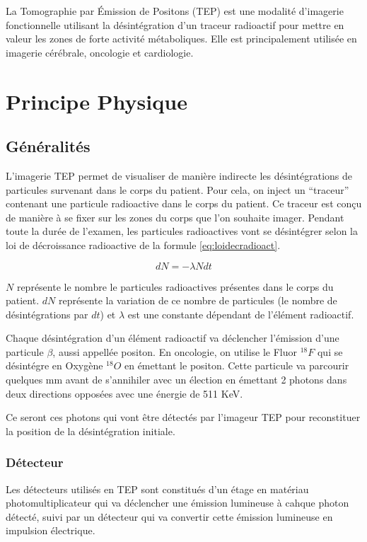 La Tomographie par \'Emission de Positons (TEP) est une modalité d'imagerie fonctionnelle utilisant la désintégration d'un traceur radioactif pour mettre en valeur les zones de forte activité métaboliques. Elle est principalement utilisée en imagerie cérébrale, oncologie et cardiologie.

\chapter{Principe Physique}


	\section{Généralités}
L'imagerie TEP permet de visualiser de manière indirecte les désintégrations de particules survenant dans le corps du patient. Pour cela, on inject un ``traceur'' contenant une particule radioactive dans le corps du patient. Ce traceur est conçu de manière à se fixer sur les zones du corps que l'on souhaite imager. Pendant toute la durée de l'examen, les particules radioactives vont se désintégrer selon la loi de décroissance radioactive de la formule \ref{eq:loidecradioact}.

\begin{equation}
	dN = - \lambda N dt
	\label{eq:loidecradioact}
\end{equation}

$N$ représente le nombre le particules radioactives présentes dans le corps du patient. $dN$ représente la variation de ce nombre de particules (le nombre de désintégrations par $dt$) et $\lambda$ est une constante dépendant de l'élément radioactif.

Chaque désintégration d'un élément radioactif va déclencher l'émission d'une particule $\beta$, aussi appellée positon. En oncologie, on utilise le Fluor $^{18}F$ qui se désintégre en Oxygène $^{18}O$ en émettant le positon. Cette particule va parcourir quelques mm avant de s'annihiler avec un élection en émettant 2 photons dans deux directions opposées avec une énergie de 511 KeV.

Ce seront ces photons qui vont être détectés par l'imageur TEP pour reconstituer la position de la désintégration initiale. 
	\subsection{Détecteur}

Les détecteurs utilisés en TEP sont constitués d'un étage en matériau photomultiplicateur qui va déclencher une émission lumineuse à cahque photon détecté, suivi par un détecteur qui va convertir cette émission lumineuse en impulsion électrique. 

